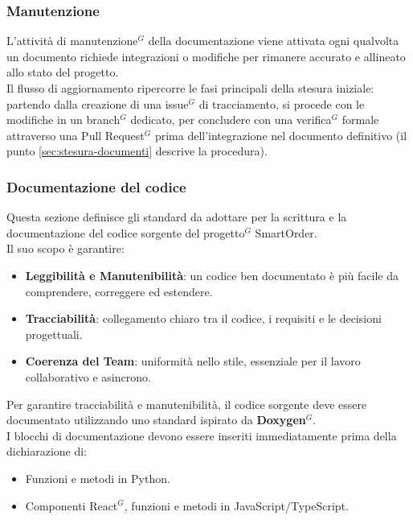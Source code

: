 \subsubsection{Manutenzione}
L'attività di manutenzione$^G$ della documentazione viene attivata ogni qualvolta un documento richiede integrazioni o modifiche per rimanere accurato e allineato allo stato del progetto.\\
Il flusso di aggiornamento ripercorre le fasi principali della stesura iniziale: partendo dalla creazione di una issue$^G$ di tracciamento, si procede con le modifiche in un branch$^G$ dedicato, per concludere con una verifica$^G$ formale attraverso una Pull Request$^G$ prima dell'integrazione nel documento definitivo (il punto \ref{sec:stesura-documenti} descrive la procedura).

\subsubsection{Documentazione del codice}
Questa sezione definisce gli standard da adottare per la scrittura e la documentazione del codice sorgente del progetto$^G$ SmartOrder.\\ 
Il suo scopo è garantire:
\begin{itemize}[itemsep=3pt, parsep=1pt, label=$\scriptstyle\bullet$]
    \item \textbf{Leggibilità e Manutenibilità}: un codice ben documentato è più facile da comprendere, correggere ed estendere.
    \item \textbf{Tracciabilità}: collegamento chiaro tra il codice, i requisiti e le decisioni progettuali.
    \item \textbf{Coerenza del Team}: uniformità nello stile, essenziale per il lavoro collaborativo e asincrono.
\end{itemize}

Per garantire tracciabilità e manutenibilità, il codice sorgente deve essere documentato utilizzando uno standard ispirato da \textbf{Doxygen$^G$}.\\
I blocchi di documentazione devono essere inseriti immediatamente prima della dichiarazione di:
\begin{itemize}[itemsep=3pt, parsep=1pt, label=$\scriptstyle\bullet$]
    \item Funzioni e metodi in Python.
    \item Componenti React$^G$, funzioni e metodi in JavaScript/TypeScript.
\end{itemize}

